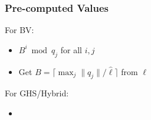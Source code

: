 \subsubsection{Pre-computed Values}

For BV:
\begin{itemize}
    \item $B^i \bmod{q_j}$ for all $i, j$
    \item Get $B = \lceil \max_j\|q_j\|/\hat{\ell}\rceil$ from $\ell$
\end{itemize}

\noindent For GHS/Hybrid:
\begin{itemize}
    \item 
\end{itemize}